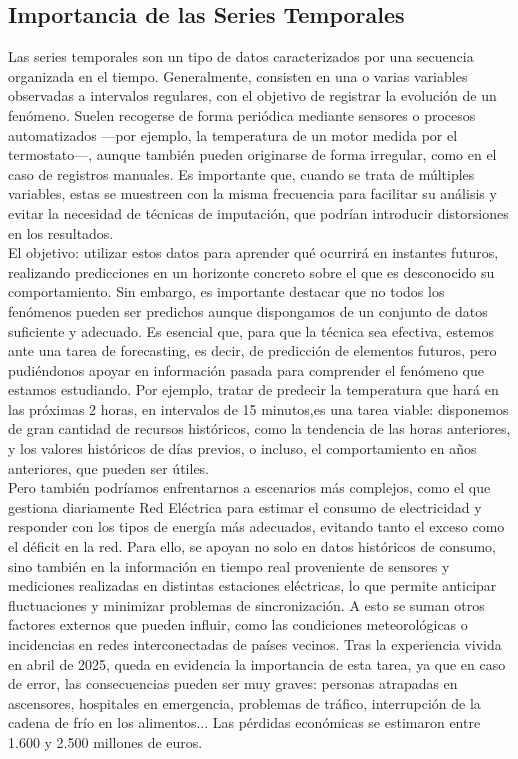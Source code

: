 \subsection{Importancia de las Series Temporales}

Las series temporales son un tipo de datos caracterizados por una secuencia organizada en el tiempo. Generalmente, consisten en una o varias variables observadas a intervalos regulares, con el objetivo de registrar la evolución de un fenómeno. Suelen recogerse de forma periódica mediante sensores o procesos automatizados —por ejemplo, la temperatura de un motor medida por el termostato—, aunque también pueden originarse de forma irregular, como en el caso de registros manuales. Es importante que, cuando se trata de múltiples variables, estas se muestreen con la misma frecuencia para facilitar su análisis y evitar la necesidad de técnicas de imputación, que podrían introducir distorsiones en los resultados.\\

El objetivo: utilizar estos datos para aprender qué ocurrirá en instantes futuros, realizando predicciones en un horizonte concreto sobre el que es desconocido su comportamiento. Sin embargo, es importante destacar que no todos los fenómenos pueden ser predichos aunque dispongamos de un conjunto de datos suficiente y adecuado. Es esencial que, para que la técnica sea efectiva, estemos ante una tarea de forecasting, es decir, de predicción de elementos futuros, pero pudiéndonos apoyar en información pasada para comprender el fenómeno que estamos estudiando. Por ejemplo, tratar de predecir la temperatura que hará en las próximas 2 horas, en intervalos de 15 minutos,es una tarea viable: disponemos de gran cantidad de recursos históricos, como la tendencia de las horas anteriores, y los valores históricos de días previos, o incluso, el comportamiento en años anteriores, que pueden ser útiles.\\

Pero también podríamos enfrentarnos a escenarios más complejos, como el que gestiona diariamente Red Eléctrica para estimar el consumo de electricidad y responder con los tipos de energía más adecuados, evitando tanto el exceso como el déficit en la red. Para ello, se apoyan no solo en datos históricos de consumo, sino también en la información en tiempo real proveniente de sensores y mediciones realizadas en distintas estaciones eléctricas, lo que permite anticipar fluctuaciones y minimizar problemas de sincronización. A esto se suman otros factores externos que pueden influir, como las condiciones meteorológicas o incidencias en redes interconectadas de países vecinos.
Tras la experiencia vivida en abril de 2025, queda en evidencia la importancia de esta tarea, ya que en caso de error, las consecuencias pueden ser muy graves: personas atrapadas en ascensores, hospitales en emergencia, problemas de tráfico, interrupción de la cadena de frío en los alimentos...
Las pérdidas económicas se estimaron entre 1.600 y 2.500 millones de euros.\\


